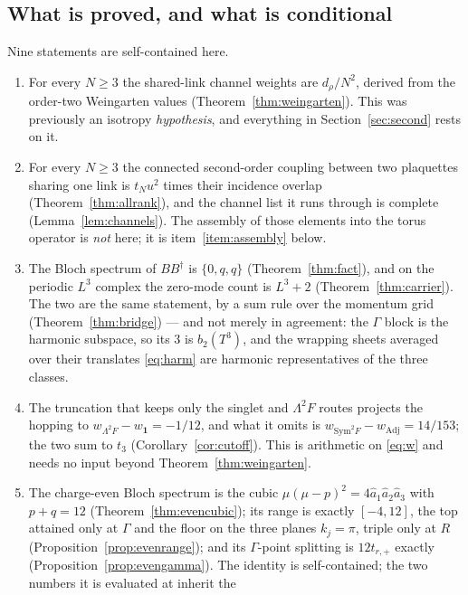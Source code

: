 \documentclass[10pt,twocolumn]{article}
\theoremstyle{plain}
\theoremstyle{definition}
\theoremstyle{remark}
\newcommand{\dg}{^{\dagger}}
\begin{document}
\subsection*{What is proved, and what is conditional}

Nine statements are self-contained here.

\begin{enumerate}\itemsep2pt
\item For every $N\ge3$ the shared-link channel weights are $d_\rho/N^2$,
  derived from the order-two Weingarten values
  (Theorem~\ref{thm:weingarten}). This was previously an isotropy
  \emph{hypothesis}, and everything in Section~\ref{sec:second} rests on it.
\item For every $N\ge3$ the connected second-order coupling between two
  plaquettes sharing one link is $t_Nu^2$ times their incidence overlap
  (Theorem~\ref{thm:allrank}), and the channel list it runs through is complete
  (Lemma~\ref{lem:channels}). The assembly of those elements into the torus
  operator is \emph{not} here; it is item~\ref{item:assembly} below.
\item The Bloch spectrum of $BB\dg$ is $\{0,q,q\}$ (Theorem~\ref{thm:fact}),
  and on the periodic $L^3$ complex the zero-mode count is $L^3+2$
  (Theorem~\ref{thm:carrier}). The two are the same statement, by a sum rule
  over the momentum grid (Theorem~\ref{thm:bridge}) --- and not merely in
  agreement: the $\Gamma$ block is the harmonic subspace, so its $3$ is
  $b_2(T^3)$, and the wrapping sheets averaged over their translates
  \eqref{eq:harm} are harmonic representatives of the three classes.
\item\label{item:cutoff} The truncation that keeps only the singlet and $\Lambda^2F$ routes
  projects the hopping to $w_{\Lambda^2F}-w_{\mathbf 1}=-1/12$, and what it
  omits is $w_{\mathrm{Sym}^2F}-w_{\mathrm{Adj}}=14/153$; the two sum to
  $t_3$ (Corollary~\ref{cor:cutoff}). This is arithmetic on
  \eqref{eq:w} and needs no input beyond Theorem~\ref{thm:weingarten}.
\item The charge-even Bloch spectrum is the cubic
  $\mu(\mu-p)^2=4\hat a_1\hat a_2\hat a_3$ with $p+q=12$
  (Theorem~\ref{thm:evencubic}); its range is exactly $[-4,12]$, the top
  attained only at $\Gamma$ and the floor on the three planes $k_j=\pi$, triple
  only at $R$ (Proposition~\ref{prop:evenrange}); and its $\Gamma$-point
  splitting is $12t_{r,+}$ exactly (Proposition~\ref{prop:evengamma}). The
  identity is self-contained; the two numbers it is evaluated at inherit the

\end{enumerate}
\end{document}
